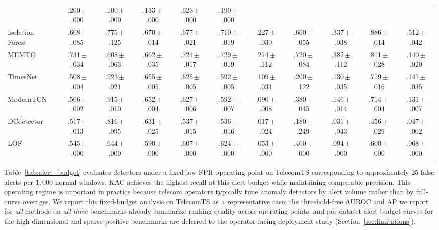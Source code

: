 \documentclass[conference]{IEEEtran}
\newcommand{\sd}[1]{\,{\fontsize{6pt}{7pt}\selectfont $\pm$#1}}
\begin{document}
\begin{table}[t]
\begin{tabular*}{\textwidth}{@{\extracolsep{\fill}}l|ccccc|ccccc@{}}
                                                 & .200\sd{.000} & .100\sd{.000} & .133\sd{.000} & .623\sd{.000} & .199\sd{.000} \\
    Isolation Forest                             & .608\sd{.085} & .775\sd{.125} & .670\sd{.014} & .677\sd{.021} & .710\sd{.019}
                                                 & .227\sd{.030} & .660\sd{.055} & .337\sd{.038} & .886\sd{.014} & .512\sd{.042} \\
    MEMTO~\cite{song2023memto}                   & .731\sd{.034} & .608\sd{.063} & .662\sd{.035} & .721\sd{.017} & .729\sd{.019}
                                                 & .274\sd{.112} & .720\sd{.084} & .382\sd{.112} & .811\sd{.028} & .440\sd{.020} \\
    TimesNet~\cite{wu2023timesnet}               & .508\sd{.004} & .923\sd{.021} & .655\sd{.005} & .625\sd{.005} & .592\sd{.005}
                                                 & .109\sd{.034} & .200\sd{.122} & .130\sd{.035} & .719\sd{.016} & .147\sd{.035} \\
    ModernTCN~\cite{luo2024moderntcn}            & .506\sd{.002} & .915\sd{.010} & .652\sd{.004} & .627\sd{.006} & .592\sd{.007}
                                                 & .090\sd{.008} & .380\sd{.045} & .146\sd{.014} & .714\sd{.004} & .131\sd{.007} \\
    DCdetector~\cite{yang2023dcdetector}         & .517\sd{.013} & .816\sd{.095} & .631\sd{.025} & .537\sd{.015} & .536\sd{.016}
                                                 & .017\sd{.024} & .180\sd{.249} & .031\sd{.043} & .456\sd{.029} & .047\sd{.002} \\
    LOF                                          & .545\sd{.000} & .644\sd{.000} & .590\sd{.000} & .607\sd{.000} & .624\sd{.000}
                                                 & .053\sd{.000} & .400\sd{.000} & .094\sd{.000} & .600\sd{.000} & .068\sd{.000} \\
    \bottomrule
  \end{tabular*}
\end{table}

Table~\ref{tab:alert_budget} evaluates detectors under a fixed low-FPR operating point on TelecomTS corresponding to approximately $25$ false alerts per $1{,}000$ normal windows. KAC achieves the highest recall at this alert budget while maintaining comparable precision. This operating regime is important in practice because telecom operators typically tune anomaly detectors by alert volume rather than by full-curve averages. We report this fixed-budget analysis on TelecomTS as a representative case; the threshold-free AUROC and AP we report for \emph{all} methods on \emph{all three} benchmarks already summarize ranking quality across operating points, and per-dataset alert-budget curves for the high-dimensional and sparse-positive benchmarks are deferred to the operator-facing deployment study (Section~\ref{sec:limitations}).
\end{document}
